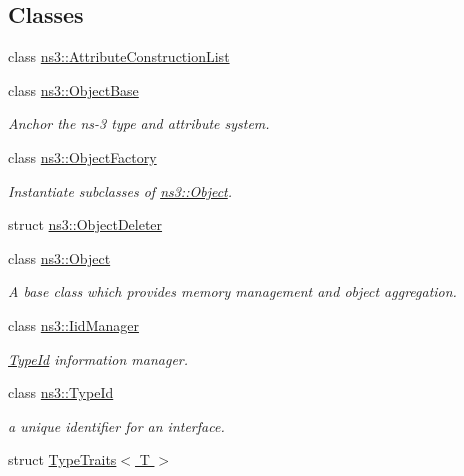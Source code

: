 \subsection*{Classes}
\begin{DoxyCompactItemize}
\item 
class \hyperlink{classns3_1_1AttributeConstructionList}{ns3\+::\+Attribute\+Construction\+List}
\item 
class \hyperlink{classns3_1_1ObjectBase}{ns3\+::\+Object\+Base}
\begin{DoxyCompactList}\small\item\em Anchor the ns-\/3 type and attribute system. \end{DoxyCompactList}\item 
class \hyperlink{classns3_1_1ObjectFactory}{ns3\+::\+Object\+Factory}
\begin{DoxyCompactList}\small\item\em Instantiate subclasses of \hyperlink{classns3_1_1Object}{ns3\+::\+Object}. \end{DoxyCompactList}\item 
struct \hyperlink{structns3_1_1ObjectDeleter}{ns3\+::\+Object\+Deleter}
\item 
class \hyperlink{classns3_1_1Object}{ns3\+::\+Object}
\begin{DoxyCompactList}\small\item\em A base class which provides memory management and object aggregation. \end{DoxyCompactList}\item 
class \hyperlink{classns3_1_1IidManager}{ns3\+::\+Iid\+Manager}
\begin{DoxyCompactList}\small\item\em \hyperlink{classns3_1_1TypeId}{Type\+Id} information manager. \end{DoxyCompactList}\item 
class \hyperlink{classns3_1_1TypeId}{ns3\+::\+Type\+Id}
\begin{DoxyCompactList}\small\item\em a unique identifier for an interface. \end{DoxyCompactList}\item 
struct \hyperlink{structTypeTraits}{Type\+Traits$<$ T $>$}
\end{DoxyCompactItemize}
